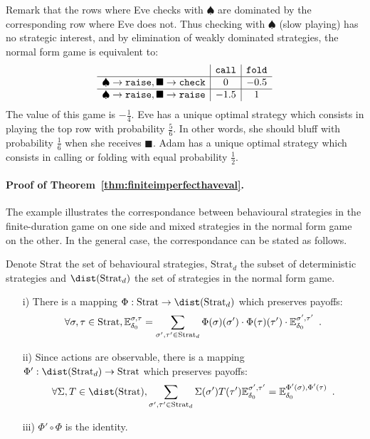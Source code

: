 Remark that the rows where Eve checks with $\spadesuit$
are dominated by the corresponding row where Eve does not.
Thus checking with $\spadesuit$ (slow playing) has no strategic interest,
and  by elimination of weakly dominated strategies,
the normal form game is equivalent to:
\[
\begin{array}{c|c|c}
&  {\tt call} &{\tt fold}\\
\hline
\spadesuit\to {\tt raise},  \blacksquare\to {\tt check}
& 0 & -0.5\\
\hline
\spadesuit\to {\tt raise},  \blacksquare\to {\tt raise}
& -1.5 & 1\\
\end{array}
\]
The value of this game is $-\frac{1}{4}$.
Eve has a unique optimal strategy which consists in playing the top row with probability
$\frac{5}{6}$.
In other words, she should bluff with probability $\frac{1}{6}$ when she receives $\blacksquare$.
Adam has a unique optimal strategy which consists in calling or folding
with equal probability $\frac{1}{2}$\enspace.
 
 
\paragraph{Proof of Theorem~\ref{thm:finiteimperfecthaveval}.}
The example illustrates
the correspondance between behavioural strategies in the finite-duration game on one side
and mixed strategies in the normal form game on the other.
In the general case, the correspondance can be stated as follows.

\newcommand{\Strat}{\text{Strat}}
\begin{lemma}\label{lem:impinffinite}
Denote $\Strat$ the set of behavioural strategies,
$\Strat_d$ the subset of deterministic strategies
and $\dist(\Strat_d)$ the set of strategies in the normal form game.
\begin{enumerate}
\item[i)]
There is a mapping 
$
\Phi : \Strat \to \dist(\Strat_d)
$ 
which preserves payoffs:
\[
\forall \sigma,\tau \in \Strat,
\mathbb{E}_{\ini}^{\sigma,\tau}
=
\sum_{\sigma',\tau' \in \Strat_d}\Phi(\sigma)(\sigma')\cdot\Phi(\tau)(\tau') 
\cdot\mathbb{E}_{\ini}^{\sigma',\tau'}\enspace.
\]
\item[ii)]
Since actions are observable,
there is a mapping 
$
\Phi' : \dist(\Strat_d) \to \Strat 
$ 
which preserves payoffs:
\[
\forall \Sigma,T \in \dist(\Strat),
\sum_{\sigma',\tau' \in \Strat_d}\Sigma(\sigma') T(\tau')
\mathbb{E}_{\ini}^{\sigma',\tau'}
=
\mathbb{E}_{\ini}^{\Phi'(\sigma),\Phi'(\tau)}
\enspace.
\]
\item[iii)]
$\Phi'\circ \Phi$ is the identity.
\end{enumerate}
\end{lemma}

